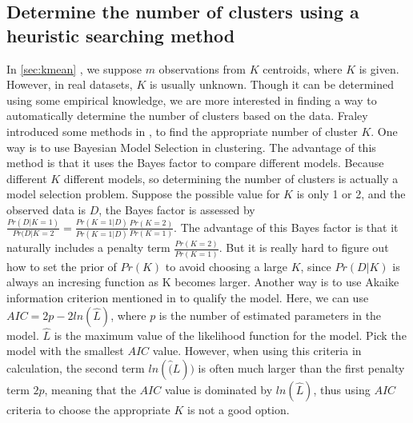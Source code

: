 \documentclass[12pt]{article}
\begin{document}
\subsection{Determine the number of clusters using a heuristic searching method}
In \ref{sec:kmean} , we suppose $m$ observations from $K$ centroids, where $K$ is given. However, in real datasets, $K$ is usually unknown. Though it can be determined using some empirical knowledge, we are more interested in finding a way to automatically determine the number of clusters based on the data. Fraley introduced some methods in \cite{fraley1998many}, to find the appropriate number of cluster $K$. One way is to use Bayesian Model Selection in clustering. The advantage of this method is that it uses the Bayes factor to compare different models. Because different $K$  different models, so determining the number of clusters is actually a model selection problem. Suppose the possible value for $K$ is only 1 or 2, and the observed data is $D$, the Bayes factor is assessed by $\frac{Pr(D|K=1)}{Pr(D|K=2}=\frac{Pr(K=1|D)}{Pr(K=1|D)}\frac{Pr(K=2)}{Pr(K=1)}$. The advantage of this Bayes factor is that it naturally includes a penalty term $\frac{Pr(K=2)}{Pr(K=1)}$. But it is really hard to figure out how to set the prior of $Pr(K)$ to avoid choosing a large $K$, since $Pr(D|K)$ is always an incresing function as K becomes larger. Another way is to use Akaike information criterion mentioned in \cite{akaike1998information} to qualify the model. Here, we can use $AIC=2p-2ln(\hat{L})$, where $p$ is the number of estimated parameters in the model. $\hat{L}$ is the maximum value of the likelihood function for the model. Pick the model with the smallest $AIC$ value. However, when using this criteria in calculation, the second term $ln(\hat(L))$ is often much larger than the first penalty term $2p$, meaning that the $AIC$ value is dominated by $ln(\hat{L})$, thus using $AIC$ criteria to choose the appropriate $K$ is not a good option.
\end{document}
